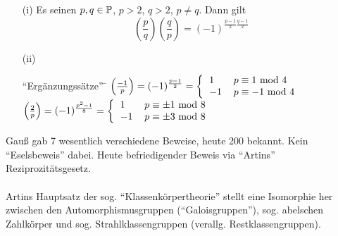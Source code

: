 \documentclass[a4paper,DIV15,BCOR12mm]{article}
\begin{document}
\begin{satz}
\begin{enumerate}
\item[(i)] Es seinen $p,q\in\mathbb{P}$, $p>2$, $q>2$, $p \neq q$. Dann gilt
$$\left(\frac{p}{q}\right)\left(\frac{q}{p}\right)=(-1)^{\frac{p-1}{2}\frac{q-1}{2}}$$
\item[(ii)] \begin{tabbing}
    "`Ergänzungssätze"' \= $\left(\frac{-1}{p}\right) = (-1)^\frac{p-1}{2} = \left\{\mbox{\begin{tabular}{ll}
    $1$ & $p \equiv 1$ mod $4$\\
    $-1$ & $p \equiv -1$ mod $4$
  \end{tabular}}\right.$ \\
  \> $\left(\frac{2}{p}\right) = (-1)^\frac{p^2-1}{8} = \left\{\mbox{\begin{tabular}{ll}
    $1$ & $p \equiv \pm 1$ mod $8$\\
    $-1$ & $p \equiv \pm 3$ mod $8$
  \end{tabular}}\right.$
\end{tabbing}
\end{enumerate}
\end{satz}
Gauß gab 7 wesentlich verschiedene Beweise, heute 200 bekannt. Kein "`Eselsbeweis"' dabei. Heute befriedigender Beweis via "`Artins"' Reziprozitätsgesetz.\\
\\
Artins Hauptsatz der sog. "`Klassenkörpertheorie"' stellt eine Isomorphie her zwischen den Automorphismusgruppen ("`Galoisgruppen"'), sog. abelschen Zahlkörper und sog. Strahlklassengruppen (verallg. Restklassengruppen).\\
\\
\end{document}

